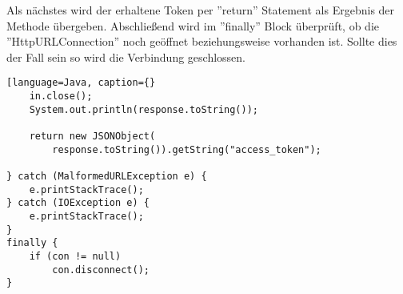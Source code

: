 Als nächstes wird der erhaltene Token per ''return'' Statement als Ergebnis der Methode übergeben. Abschließend wird im ''finally'' Block überprüft, ob die ''HttpURLConnection'' noch geöffnet beziehungsweise vorhanden ist. Sollte dies der Fall sein so wird die Verbindung geschlossen.
\begin{lstlisting}[language=Java, caption={}
	in.close();
	System.out.println(response.toString());

	return new JSONObject(
     	response.toString()).getString("access_token");
     	
} catch (MalformedURLException e) {
	e.printStackTrace();
} catch (IOException e) {
    e.printStackTrace();
}
finally {
	if (con != null)
    	con.disconnect();
}
\end{lstlisting}




